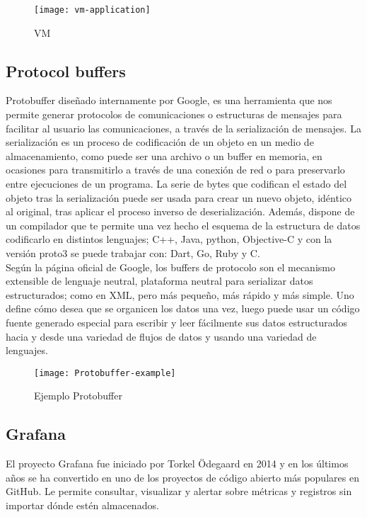 \documentclass[ spanish, a4paper, 12pt, oneside]{report}
\begin{document}
\begin{figure}[!h]
   \centering
   \texttt{[image: vm-application]}\\
      \caption{\label{fig: vm} VM}
\end{figure}



\subsection{Protocol buffers}
Protobuffer diseñado internamente por Google, es una herramienta que nos permite generar protocolos de comunicaciones o estructuras de mensajes para facilitar al usuario las comunicaciones, a través de la serialización de mensajes.
La serialización es un proceso de codificación de un objeto en un medio de almacenamiento, como puede ser una archivo o un buffer en memoria, en ocasiones para transmitirlo a través de una conexión de red o para preservarlo entre ejecuciones 
de un programa. La serie de bytes que codifican el estado del objeto tras la serialización puede ser usada para crear un nuevo objeto, idéntico al original, tras aplicar el proceso inverso de deserialización. Además, dispone de un compilador que 
te permite una vez hecho el esquema de la estructura de datos codificarlo en distintos lenguajes; C++, Java, python, Objective-C y con la versión proto3 se puede trabajar con: Dart, Go, Ruby y C. \\ 

Según la página oficial de Google, los buffers de protocolo son el mecanismo extensible de lenguaje neutral, plataforma neutral para serializar datos estructurados; como en XML, pero más pequeño, más rápido y más simple. Uno define cómo desea que se 
organicen los datos una vez, luego puede usar un código fuente generado especial para escribir y leer fácilmente sus datos estructurados hacia y desde una variedad de flujos de datos y usando una variedad de lenguajes. \\

\begin{figure}[!h]
   \centering
   \texttt{[image: Protobuffer-example]}\\
      \caption{\label{fig: Protobuffer example} Ejemplo Protobuffer}
\end{figure}

\subsection{Grafana}
El proyecto Grafana fue iniciado por Torkel Ödegaard en 2014 y en los últimos años se ha convertido en uno de los proyectos de código abierto más populares en GitHub. Le permite consultar, visualizar y alertar sobre métricas y registros sin importar 
dónde estén almacenados. \\
\end{document}
